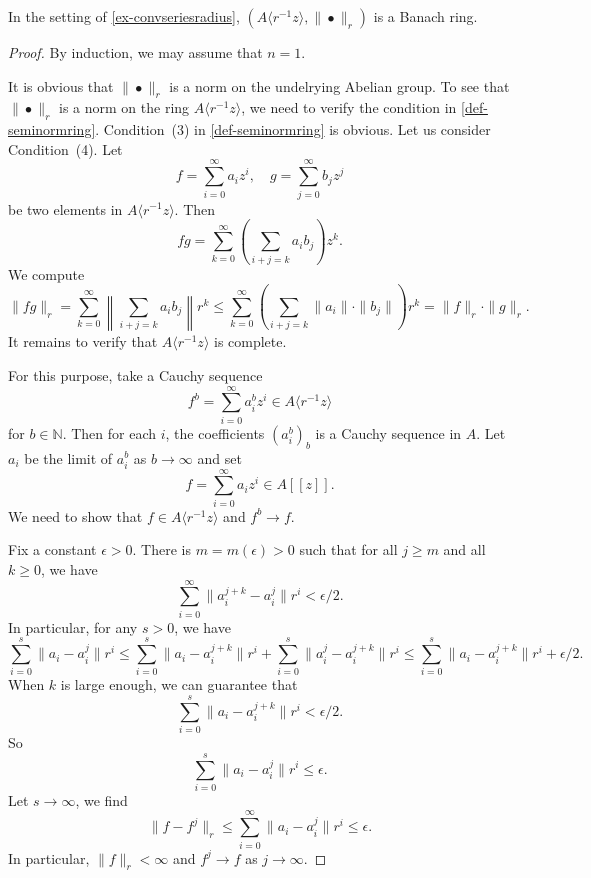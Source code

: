 \begin{proposition}\label{prop-convseriesradiusBanach}
    In the setting of \cref{ex-convseriesradius}, $(A\langle r^{-1}z \rangle  ,\|\bullet\|_r)$ is a Banach ring.
\end{proposition}
\begin{proof}
    By induction, we may assume that $n=1$.

    It is obvious that $\|\bullet\|_r$ is a norm on the undelrying Abelian group. To see that $\|\bullet\|_r$ is a norm on the ring $A\langle r^{-1}z \rangle $, we need to verify the condition in \cref{def-seminormring}. Condition~(3) in \cref{def-seminormring} is obvious. 
    Let us consider Condition~(4). 
    Let 
    \[
        f=\sum_{i=0}^{\infty} a_i z^i,\quad g=\sum_{j=0}^{\infty} b_j z^j
    \]
    be two elements in $A\langle r^{-1}z \rangle $. Then
    \[
        fg=\sum_{k=0}^{\infty} \left(\sum_{i+j=k}a_i b_j\right) z^k. 
    \]
    We compute
    \[
        \|fg\|_r=  \sum_{k=0}^{\infty} \left\|\sum_{i+j=k}a_i b_j\right\| r^k\leq \sum_{k=0}^{\infty} \left(\sum_{i+j=k}\|a_i\|\cdot \|b_j\|\right) r^k=\|f\|_r\cdot \|g\|_r. 
    \]
    It remains to verify that $A\langle r^{-1}z \rangle$ is complete. 


    For this purpose, take a Cauchy sequence 
    \[
        f^b=\sum_{i=0}^{\infty}a^b_i z^i\in A\langle r^{-1}z \rangle
    \]
    for $b\in \mathbb{N}$. Then for each $i$, the coefficients $(a^b_i)_b$ is a Cauchy sequence in $A$. Let $a_i$ be the limit of $a^b_i$ as $b\to\infty$ and set 
    \[
        f=\sum_{i=0}^{\infty}a_i z^i\in A[[z]].
    \]
    We need to show that $f\in A\langle r^{-1}z \rangle$ and $f^b\to f$. 
    
    Fix a constant $\epsilon>0$. There is $m=m(\epsilon)>0$ such that for all $j\geq m$ and all $k\geq 0$, we have
    \[
        \sum_{i=0}^{\infty}\|a^{j+k}_i-a^{j}_i\|r^{i}<\epsilon/2.
    \]
    In particular, for any $s>0$, we have
    \[
        \sum_{i=0}^{s}\|a_i-a^{j}_i\|r^{i}\leq \sum_{i=0}^{s}\|a_i-a^{j+k}_i\|r^{i}+\sum_{i=0}^{s}\|a^j_i-a^{j+k}_i\|r^{i}\leq \sum_{i=0}^{s}\|a_i-a^{j+k}_i\|r^{i}+\epsilon/2.
    \]
    When $k$ is large enough, we can guarantee that
    \[
        \sum_{i=0}^{s}\|a_i-a^{j+k}_i\|r^{i}<\epsilon/2.  
    \]
    So
    \[
        \sum_{i=0}^{s}\|a_i-a^{j}_i\|r^{i}\leq \epsilon.  
    \]
    Let $s\to\infty$, we find
    \[
        \|f-f^j\|_r\leq \sum_{i=0}^{\infty}\|a_i-a^{j}_i\|r^{i}\leq \epsilon.  
    \]
    In particular, $\|f\|_r<\infty$ and $f^j\to f$ as $j\to\infty$.
\end{proof}


